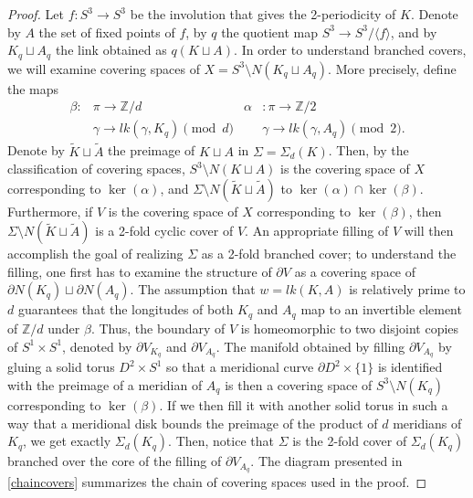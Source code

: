 \documentclass[11pt]{amsart}
\newcommand{\Z}{\mathbb{Z}}
\begin{document}
\begin{proof}  Let $f:S^3\to S^3$ be the involution that gives the 2-periodicity of $K$. Denote by $A$ the set of fixed points of $f$, by $q$ the quotient map $S^3\to S^3/\langle f\rangle$, and by $K_q\sqcup A_q$ the link obtained as $q(K\sqcup A)$. In order to understand branched covers, we will examine covering spaces of $X=S^3 \setminus N(K_q\sqcup A_q)$. More precisely, define the maps
\begin{align*}
\beta:&\pi\longrightarrow \Z/d & \alpha&:\pi\longrightarrow \Z/2\\
&\gamma\longrightarrow lk(\gamma,K_q) \pmod{d}& &\gamma\longrightarrow lk(\gamma,A_q) \pmod{2}.
\end{align*}
Denote by $\widetilde{K}\sqcup \widetilde{A}$ the preimage of $K\sqcup A$ in $\Sigma=\Sigma_d(K)$. Then, by the classification of covering spaces, $S^3\setminus N\left(K\sqcup A\right)$ is the covering space of $X$ corresponding to $\ker(\alpha)$, and $\Sigma\setminus N\left(\widetilde{K}\sqcup \widetilde{A}\right)$ to $\ker(\alpha)\cap\ker(\beta)$. Furthermore, if $V$ is the covering space of $X$ corresponding to $\ker(\beta)$, then $\Sigma\setminus N\left(\widetilde{K}\sqcup \widetilde{A}\right)$ is a 2-fold cyclic cover of $V$. An appropriate filling of $V$ will then accomplish the goal of realizing $\Sigma$ as a 2-fold branched cover; to understand the filling, one first has to examine the structure of $\partial V$ as a covering space of $\partial N(K_q)\sqcup\partial N(A_q)$. The assumption that $w=lk(K,A)$ is relatively prime to $d$ guarantees that the longitudes of both $K_q$ and $A_q$ map to an invertible element of $\Z/d$ under $\beta$. Thus, the boundary of $V$ is homeomorphic to two disjoint copies of $S^1\times S^1$, denoted by $\partial V_{K_q}$ and $\partial V_{A_q}$. The manifold obtained by filling $\partial V_{A_q}$ by gluing a solid torus $D^2\times S^1$ so that a meridional curve $\partial D^2\times \{1\}$ is identified with the preimage of a meridian of $A_q$ is then a covering space of $S^3\setminus N(K_q)$ corresponding to $\ker(\beta)$. If we then fill it with another solid torus in such a way that a meridional disk bounds the preimage of the product of $d$ meridians of $K_q$, we get exactly $\Sigma_d(K_q)$. Then, notice that $\Sigma$ is the 2-fold cover of $\Sigma_d(K_q)$ branched over the core of the filling of $\partial V_{A_q}$. The diagram presented in \cref{chaincovers} summarizes the chain of covering spaces used in the proof.


\end{proof}
\end{document}

